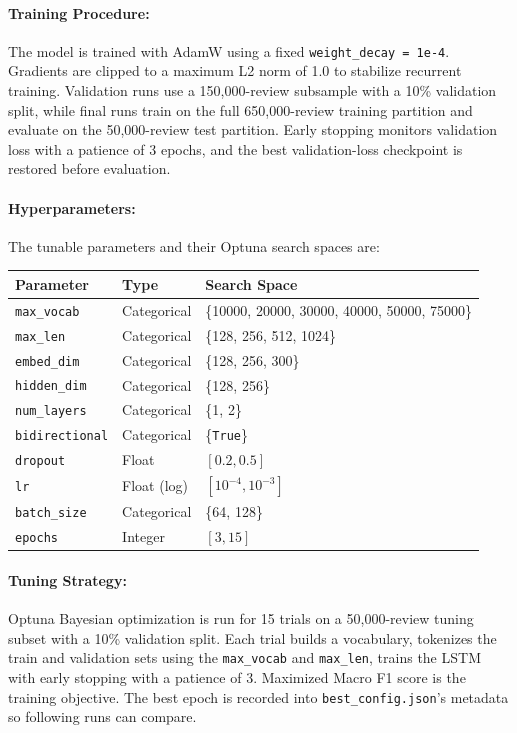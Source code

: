 \documentclass[12pt]{article}
\begin{document}
\paragraph{Training Procedure:}
The model is trained with AdamW using a fixed \texttt{weight\_decay = 1e-4}. Gradients are clipped to a maximum L2 norm of 1.0 to stabilize recurrent training. Validation runs use a 150,000-review subsample with a 10\% validation split, while final runs train on the full 650,000-review training partition and evaluate on the 50,000-review test partition. Early stopping monitors validation loss with a patience of 3 epochs, and the best validation-loss checkpoint is restored before evaluation.

\paragraph{Hyperparameters:}
The tunable parameters and their Optuna search spaces are:

\begin{table}[H]
    \centering
    \begin{tabular}{lll}
        \toprule
        Parameter & Type & Search Space \\
        \midrule
        \texttt{max\_vocab} & Categorical & \{10000, 20000, 30000, 40000, 50000, 75000\} \\
        \texttt{max\_len} & Categorical & \{128, 256, 512, 1024\} \\
        \texttt{embed\_dim} & Categorical & \{128, 256, 300\} \\
        \texttt{hidden\_dim} & Categorical & \{128, 256\} \\
        \texttt{num\_layers} & Categorical & \{1, 2\} \\
        \texttt{bidirectional} & Categorical & \{\texttt{True}\} \\
        \texttt{dropout} & Float & $[0.2, 0.5]$ \\
        \texttt{lr} & Float (log) & $[10^{-4}, 10^{-3}]$ \\
        \texttt{batch\_size} & Categorical & \{64, 128\} \\
        \texttt{epochs} & Integer & $[3, 15]$ \\
        \bottomrule
    \end{tabular}
\end{table}

\paragraph{Tuning Strategy:}
Optuna Bayesian optimization is run for 15 trials on a 50,000-review tuning subset with a 10\% validation split. Each trial builds a vocabulary, tokenizes the train and validation sets using the \texttt{max\_vocab} and \texttt{max\_len}, trains the LSTM with early stopping with a patience of 3. Maximized Macro F1 score is the training objective. The best epoch is recorded into \texttt{best\_config.json}'s metadata so following runs can compare.
\end{document}
